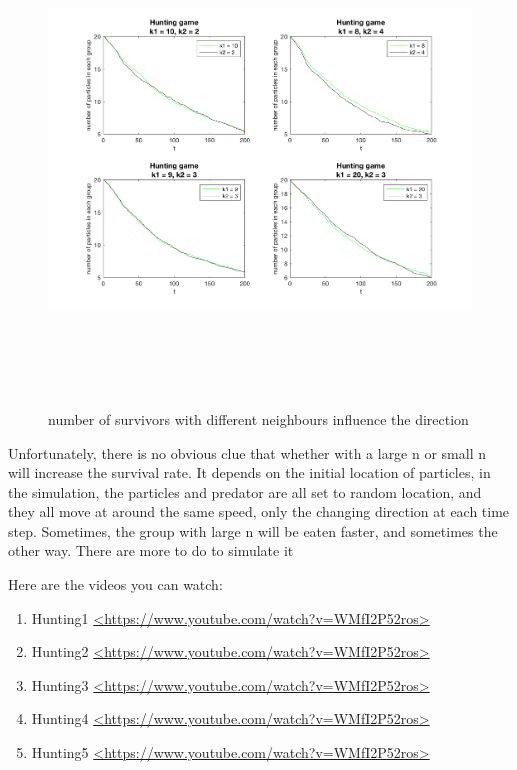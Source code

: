 \documentclass[12pt]{article}
\begin{document}
\begin{figure}[H] %
\centering
\includegraphics[width = 16 cm, height = 13cm]{hunt.png}
\caption{number of survivors with different neighbours influence the direction}
\label{fig:huntpic}
\end{figure}

Unfortunately, there is no obvious clue that whether with a large n or small n will increase the survival rate. It depends on the initial location of particles, in the simulation, the particles and predator are all set to random location, and they all move at around the same speed, only the changing direction at each time step. Sometimes, the group with large n will be eaten faster, and sometimes the other way. There are more to do to simulate it 


Here are the videos you can watch:



\begin{enumerate} %
\item Hunting1 \url{<https://www.youtube.com/watch?v=WMfI2P52ros>}
\item Hunting2 \url{<https://www.youtube.com/watch?v=WMfI2P52ros>}
\item Hunting3 \url{<https://www.youtube.com/watch?v=WMfI2P52ros>}
\item Hunting4 \url{<https://www.youtube.com/watch?v=WMfI2P52ros>}
\item Hunting5 \url{<https://www.youtube.com/watch?v=WMfI2P52ros>}
\end{enumerate}
\end{document}
